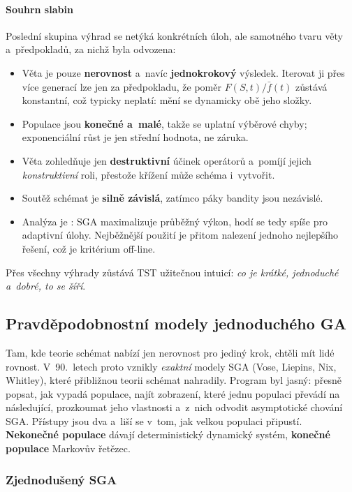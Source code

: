 \documentclass[11pt,a4paper]{article}
\theoremstyle{definition}
\begin{document}
\paragraph{Souhrn slabin}

Poslední skupina výhrad se netýká konkrétních úloh, ale samotného tvaru věty a~předpokladů,
za nichž byla odvozena:

\begin{itemize}
\item Věta je pouze \textbf{nerovnost} a~navíc \textbf{jednokrokový} výsledek. Iterovat
  ji přes více generací lze jen za předpokladu, že poměr $F(S,t)/\bar f(t)$ zůstává
  konstantní, což typicky neplatí: mění se dynamicky obě jeho složky.
\item Populace jsou \textbf{konečné a~malé}, takže se uplatní výběrové chyby;
  exponenciální růst je jen střední hodnota, ne záruka.
\item Věta zohledňuje jen \textbf{destruktivní} účinek operátorů a~pomíjí jejich
  \emph{konstruktivní} roli, přestože křížení může schéma i~vytvořit.
\item Soutěž schémat je \textbf{silně závislá}, zatímco páky bandity jsou nezávislé.
\item Analýza je : SGA maximalizuje průběžný výkon, hodí se tedy
  spíše pro adaptivní úlohy. Nejběžnější použití je přitom nalezení jednoho
  nejlepšího řešení, což je kritérium off-line.
\end{itemize}

Přes všechny výhrady zůstává TST užitečnou intuicí: \emph{co je krátké, jednoduché
a~dobré, to se šíří}.

\subsection{Pravděpodobnostní modely jednoduchého GA}
\label{sec:vose}


Tam, kde teorie schémat nabízí jen nerovnost pro jediný krok, chtěli mít lidé rovnost.
V~90.\ letech proto vznikly \emph{exaktní} modely SGA (Vose, Liepins, Nix, Whitley),
které přibližnou teorii schémat nahradily. Program byl jasný: přesně popsat, jak vypadá
populace, najít zobrazení, které jednu populaci převádí na následující, prozkoumat jeho
vlastnosti a~z~nich odvodit asymptotické chování SGA. Přístupy jsou dva a~liší se v~tom,
jak velkou populaci připustí. \textbf{Nekonečné populace} dávají deterministický
dynamický systém, \textbf{konečné populace} Markovův řetězec.

\subsubsection{Zjednodušený SGA}
\end{document}
